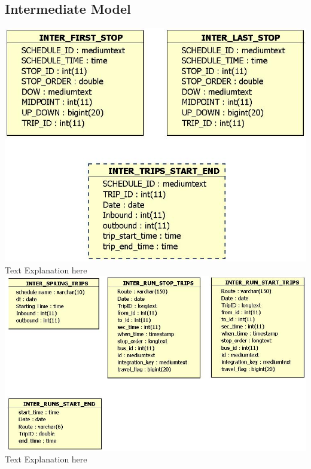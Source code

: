 \documentclass[12pt]{article}
\begin{document}
\subsection{Intermediate Model}
\includegraphics[scale=0.5]{resources/Inter_schedule}\\[1cm] 
Text Explanation here\\
\includegraphics[scale=0.5]{resources/Inter_runs}\\[1cm] 
Text Explanation here\\
\end{document}
